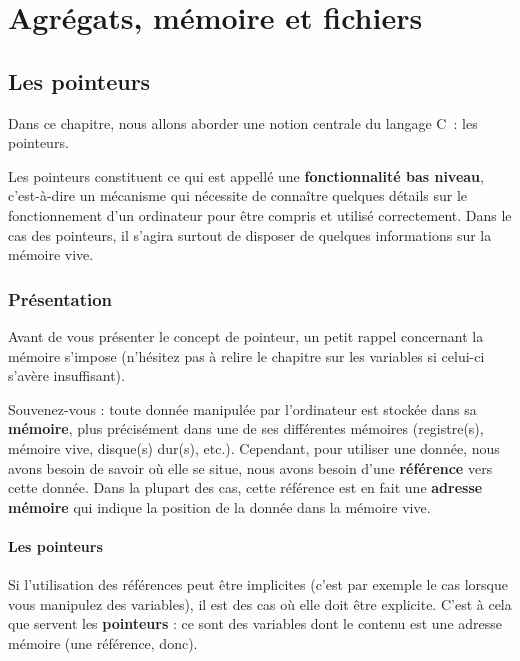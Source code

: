 \part{Agrégats, mémoire et fichiers }
\label{agrégats,-mémoire-et-fichiers }

\chapter{Les pointeurs}
\label{les-pointeurs}

Dans ce chapitre, nous allons aborder une notion centrale du langage C~: les pointeurs.

Les pointeurs constituent ce qui est appellé une \textbf{fonctionnalité
bas niveau}, c'est-à-dire un mécanisme qui nécessite de connaître
quelques détails sur le fonctionnement d'un ordinateur pour être compris
et utilisé correctement. Dans le cas des pointeurs, il s'agira surtout
de disposer de quelques informations sur la mémoire vive.

\section{Présentation}
\label{presentation}

Avant de vous présenter le concept de
pointeur, un petit rappel concernant la mémoire s'impose (n'hésitez pas
à relire le chapitre sur les variables si celui-ci s'avère insuffisant).

Souvenez-vous : toute donnée manipulée par l'ordinateur est stockée dans
sa \textbf{mémoire}, plus précisément dans une de ses différentes
mémoires (registre(s), mémoire vive, disque(s) dur(s), etc.). Cependant,
pour utiliser une donnée, nous avons besoin de savoir où elle se situe,
nous avons besoin d'une \textbf{référence} vers cette donnée. Dans la
plupart des cas, cette référence est en fait une \textbf{adresse
mémoire} qui indique la position de la donnée dans la mémoire vive.

\subsection{Les pointeurs}
\label{les-pointeurs-1}

Si l'utilisation des références peut être implicites (c'est par exemple
le cas lorsque vous manipulez des variables), il est des cas où elle
doit être explicite. C'est à cela que servent les \textbf{pointeurs} :
ce sont des variables dont le contenu est une adresse mémoire (une
référence, donc).

